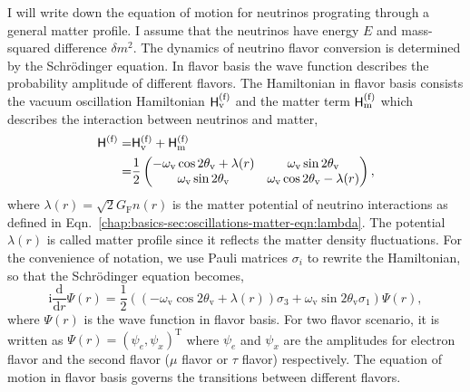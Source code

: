 I will write down the equation of motion for neutrinos prograting through a general matter profile. I assume that the neutrinos have energy $E$ and mass-squared difference $\delta m^2$. The dynamics of neutrino flavor conversion is determined by the Schr\"{o}dinger equation. In flavor basis the wave function describes the probability amplitude of different flavors. The Hamiltonian in flavor basis consists the vacuum oscillation Hamiltonian $\mathsf H^{(\mathrm f)}_{\mathrm v}$ and the matter term $\mathsf H^{(\mathrm f)}_{\mathrm{m}}$ which describes the interaction between neutrinos and matter,
\begin{align}
    \mathsf H^{(\mathrm{f})} =&  \mathsf H^{(\mathrm f)}_{\mathrm v} + \mathsf H^{(\mathrm f)}_{\mathrm m} \nonumber\\
    =&  \frac{1}{2} \begin{pmatrix}
    -\omega_{\mathrm{v}} \cos 2\theta_{\mathrm{v}} + \lambda(r) & \omega_{\mathrm{v}}\sin 2\theta_{\mathrm{v}} \\
   \omega_{\mathrm{v}} \sin 2\theta_{\mathrm{v}} & \omega_{\mathrm{v}} \cos 2\theta_{\mathrm{v}} - \lambda(r)
    \end{pmatrix},
\end{align}
where $\lambda(r)= \sqrt{2}G_{\mathrm F} n(r)$ is the matter potential of neutrino interactions as defined in Eqn.~\ref{chap:basics-sec:oscillations-matter-eqn:lambda}. The potential $\lambda(r)$ is called matter profile since it reflects the matter density fluctuations. For the convenience of notation, we use Pauli matrices $\sigma_i$ to rewrite the Hamiltonian, so that the Schr\"{o}dinger equation becomes,
\begin{equation*}
    \mathrm i\frac{\mathrm d}{\mathrm d r}\Psi(r) = \frac{1}{2} \left(
    (- \omega_{\mathrm{v}}\cos 2\theta_{\mathrm{v}} + \lambda(r) ) \sigma_3 + \omega_{\mathrm{v}}\sin 2\theta_{\mathrm{v}} \sigma_1
    \right)
    \Psi(r),
\end{equation*}
where $\Psi(r)$ is the wave function in flavor basis. For two flavor scenario, it is written as $ \Psi(r) = \left(
    \psi_{e} ,
    \psi_{x}
    \right)^{\mathrm{T}}$
where $\psi_{e}$ and $\psi_{x}$ are the amplitudes for electron flavor and the second flavor ($\mu$ flavor or $\tau$ flavor) respectively. The equation of motion in flavor basis governs the transitions between different flavors.

